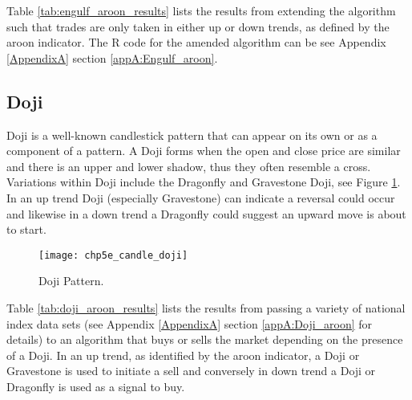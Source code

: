 

Table \ref{tab:engulf_aroon_results} lists the results from extending the algorithm such that trades are only taken in either up or down trends, as defined by the aroon indicator. The R code for the amended algorithm can be see Appendix \ref{AppendixA} section \ref{appA:Engulf_aroon}.



\subsection{Doji}
Doji is a well-known candlestick pattern that can appear on its own or as a component of a pattern. A Doji forms when the open and close price are similar and there is an upper and lower shadow, thus they often resemble a cross. Variations within Doji include the Dragonfly and Gravestone Doji, see Figure \ref{fig:chp5e:doji}. In an up trend Doji (especially Gravestone) can indicate a reversal could occur and likewise in a down trend a Dragonfly could suggest an upward move is about to start.

\begin{figure}[tbph]
\centering
\texttt{[image: chp5e\_candle\_doji]}
\caption[ Doji Star.]{Doji Pattern.}
\label{fig:chp5e:doji}
\end{figure}

Table \ref{tab:doji_aroon_results} lists the results from passing a variety of national index data sets (see Appendix \ref{AppendixA} section \ref{appA:Doji_aroon} for details) to an algorithm that buys or sells the market depending on the presence of a Doji. In an up trend, as identified by the aroon indicator, a Doji or Gravestone is used to initiate a sell and conversely in down trend a Doji or Dragonfly is used as a signal to buy.


 
